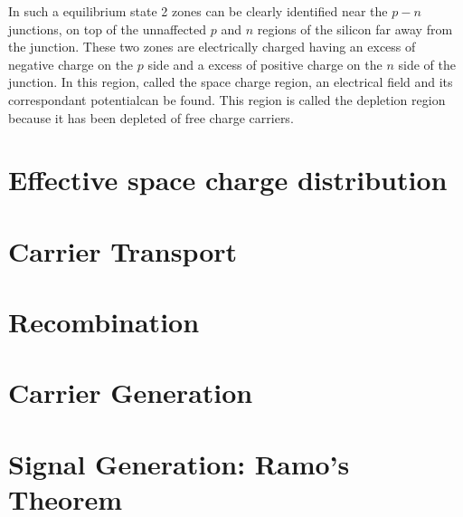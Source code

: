 In such a equilibrium state 2 zones can be clearly identified near the $p-n$ junctions, on top of the unnaffected $p$ and $n$ regions of the silicon far away from the junction. These two zones are electrically charged having an excess of negative charge on the $p$ side and a excess of positive charge on the $n$ side of the junction. In this region, called the space charge region, an electrical field and its correspondant potentialcan be found. This region is called the depletion region because it has been depleted of free charge carriers.

\section{Effective space charge distribution} 


\section{Carrier Transport}


\section{Recombination} 

\section{Carrier Generation}

\section{Signal Generation: Ramo's Theorem} %

